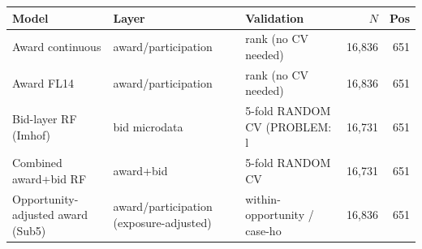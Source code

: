 \begin{tabular}{lllrr}
\toprule
Model & Layer & Validation & $N$ & Pos \\
\midrule
Award continuous & award/participation & rank (no CV needed) & 16,836 & 651 \\
Award FL14 & award/participation & rank (no CV needed) & 16,836 & 651 \\
Bid-layer RF (Imhof) & bid microdata & 5-fold RANDOM CV (PROBLEM: l & 16,731 & 651 \\
Combined award+bid RF & award+bid & 5-fold RANDOM CV & 16,731 & 651 \\
Opportunity-adjusted award (Sub5) & award/participation (exposure-adjusted) & within-opportunity / case-ho & 16,836 & 651 \\
\bottomrule
\end{tabular}
